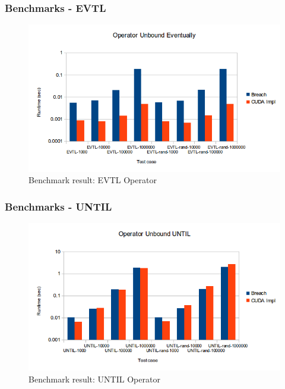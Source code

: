 \documentclass[notes=show]{beamer}
\begin{document}
\begin{frame}
\frametitle{Benchmarks - EVTL}
\begin{figure}[H]
    \includegraphics[scale=0.5]{bm_evtl.png}
    \caption{
        \label{fig:bm_evtl}
        Benchmark result: EVTL Operator}
\end{figure}
\end{frame}

\begin{frame}
\frametitle{Benchmarks - UNTIL}
\begin{figure}[H]
    \includegraphics[scale=0.5]{bm_until.png}
    \caption{
        \label{fig:bm_until}
        Benchmark result: UNTIL Operator}
\end{figure}
\end{frame}
\end{document}
